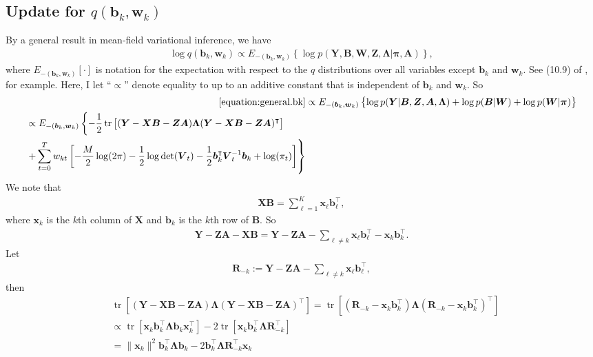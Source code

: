 \documentclass[11pt,authoryear]{article}
\DeclareMathOperator*{\tr}{tr}
\newcommand{\bs}[1]{\boldsymbol{#1}}
\begin{document}
\subsection{Update for $q(\bs{b}_k,\bs{w}_k)$}
By a general result in mean-field variational inference, we have
\begin{align}
\label{equation:general.bk}\log q(\bs{b}_k,\bs{w}_k)\propto E_{-(\bs{b}_k,\bs{w}_k)}\left\{\log p(\bs{Y},\bs{B},\bs{W},\bs{Z},\bs{\Lambda}|\bs{\pi},\bs{A})\right\},
\end{align}
where $E_{-(\bs{b}_k,\bs{w}_k)}[\cdot]$ is notation for the
expectation with respect to the $q$ distributions over all variables
except $\bs{b}_k$ and $\bs{w}_k$. See (10.9) of
\citet{bishop2006pattern}, for example. Here, I let ``$\propto$''
denote equality to up to an additive constant that is independent of
$\bs{b}_k$ and $\bs{w}_k$. So
\begin{align}
  \eqref{equation:general.bk} &\propto E_{-(\bs{b}_k,\bs{w}_k)}\left\{\log p(\bs{Y}|\bs{B}, \bs{Z}, \bs{A}, \bs{\Lambda}) + \log p(\bs{B}|\bs{W}) + \log p(\bs{W}|\bs{\pi})\right\}\\
  \begin{split}
    \label{equation:plugin.density}
    &\propto E_{-(\bs{b}_k,\bs{w}_k)}\left\{-\frac{1}{2}\tr\left[(\bs{Y}-\bs{X}\bs{B}-\bs{Z}\bs{A})\bs{\Lambda}(\bs{Y}-\bs{X}\bs{B} - \bs{Z}\bs{A})^{\intercal}\right]\right.\\
    & \left.+ \sum_{t = 0}^Tw_{kt}\left[-\frac{M}{2}\log(2\pi) - \frac{1}{2}\log\det(\bs{V}_t) - \frac{1}{2}\bs{b}_k^{\intercal}\bs{V}_t^{-1}\bs{b}_k + \log(\pi_t)\right]\right\}
  \end{split}
\end{align}
We note that
\begin{align}
\bs{X}\bs{B} = \sum_{\ell = 1}^K\bs{x}_{\ell}\bs{b}_{\ell}^{\intercal},
\end{align}
where $\bs{x}_k$ is the $k$th column of $\bs{X}$ and $\bs{b}_k$ is the $k$th row of $\bs{B}$. So
\begin{align}
\bs{Y} - \bs{Z}\bs{A} - \bs{X}\bs{B} = \bs{Y} - \bs{Z}\bs{A} - \sum_{\ell \neq k}\bs{x}_{\ell}\bs{b}_{\ell}^{\intercal} - \bs{x}_{k}\bs{b}_{k}^{\intercal}.
\end{align}
Let
\begin{align}
\bs{R}_{-k} := \bs{Y} - \bs{Z}\bs{A} - \sum_{\ell \neq k}\bs{x}_{\ell}\bs{b}_{\ell}^{\intercal},
\end{align}
then
\begin{align}
&\tr\left[(\bs{Y}-\bs{X}\bs{B}-\bs{Z}\bs{A})\bs{\Lambda}(\bs{Y}-\bs{X}\bs{B} - \bs{Z}\bs{A})^{\intercal}\right] = \tr\left[(\bs{R}_{-k} - \bs{x}_{k}\bs{b}_{k}^{\intercal})\bs{\Lambda}(\bs{R}_{-k} - \bs{x}_{k}\bs{b}_{k}^{\intercal})^{\intercal}\right]\\
&\propto \tr\left[\bs{x}_k\bs{b}_k^{\intercal}\bs{\Lambda}\bs{b}_k\bs{x}_k^{\intercal}\right] - 2\tr\left[\bs{x}_k\bs{b}_k^{\intercal}\bs{\Lambda}\bs{R}_{-k}^{\intercal}\right]\\
\label{equation:expand.bk}&= \|\bs{x}_k\|^2\bs{b}_k^{\intercal}\bs{\Lambda}\bs{b}_k -2\bs{b}_k^{\intercal}\bs{\Lambda}\bs{R}_{-k}^{\intercal}\bs{x}_k
\end{align}
\end{document}
